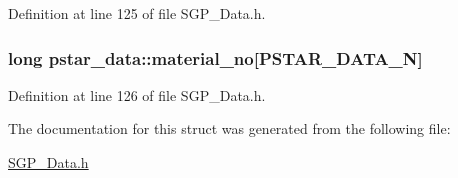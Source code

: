 Definition at line 125 of file SGP\_\-Data.h.\hypertarget{structpstar__data_9912dd060cf2dc98a13afebee1efda35}{
\subsubsection[material\_\-no]{\setlength{\rightskip}{0pt plus 5cm}long {\bf pstar\_\-data::material\_\-no}\mbox{[}PSTAR\_\-DATA\_\-N\mbox{]}}}
\label{df/d58/structpstar__data_9912dd060cf2dc98a13afebee1efda35}




Definition at line 126 of file SGP\_\-Data.h.

The documentation for this struct was generated from the following file:\begin{CompactItemize}
\item 
\hyperlink{SGP__Data_8h}{SGP\_\-Data.h}\end{CompactItemize}
